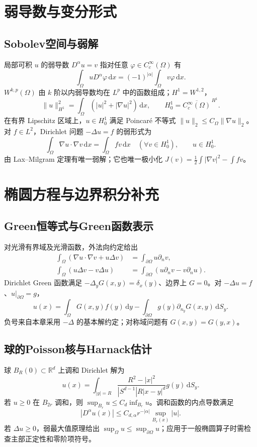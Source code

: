\documentclass[../main.tex]{subfiles}
\begin{document}
\section{弱导数与变分形式}
\subsection{Sobolev空间与弱解}
局部可积 $u$ 的弱导数 $D^\alpha u=v$ 指对任意 $\varphi\in C_c^\infty(\Omega)$ 有
\[
\int_\Omega uD^\alpha\varphi\,\mathrm dx=(-1)^{|\alpha|}\int_\Omega v\varphi\,\mathrm dx.
\]
$W^{k,p}(\Omega)$ 由 $k$ 阶以内弱导数均在 $L^p$ 中的函数组成；$H^1=W^{1,2}$，
\[
\|u\|_{H^1}^2=\int_\Omega(|u|^2+|\nabla u|^2)\,\mathrm dx,\qquad
H_0^1=\overline{C_c^\infty(\Omega)}^{\,H^1}.
\]
在有界 Lipschitz 区域上，$u\in H_0^1$ 满足 Poincaré 不等式 $\|u\|_2\le C_\Omega\|\nabla u\|_2$。对 $f\in L^2$，Dirichlet 问题 $-\Delta u=f$ 的弱形式为
\[
\int_\Omega\nabla u\cdot\nabla v\,\mathrm dx=\int_\Omega fv\,\mathrm dx
\quad(\forall v\in H_0^1),\qquad u\in H_0^1.
\]
由 Lax--Milgram 定理有唯一弱解；它也唯一极小化 $J(v)=\tfrac12\int|\nabla v|^2-\int fv$。
\section{椭圆方程与边界积分补充}
\subsection{Green恒等式与Green函数表示}
对光滑有界域及光滑函数，外法向约定给出
\begin{align*}
\int_\Omega(\nabla u\cdot\nabla v+u\Delta v)&=\int_{\partial\Omega}u\partial_nv,\\
\int_\Omega(u\Delta v-v\Delta u)&=\int_{\partial\Omega}(u\partial_nv-v\partial_nu).
\end{align*}
Dirichlet Green 函数满足 $-\Delta_yG(x,y)=\delta_x(y)$、边界上 $G=0$。对 $-\Delta u=f$、$u|_{\partial\Omega}=g$，
\[
u(x)=\int_\Omega G(x,y)f(y)\,\mathrm dy
-\int_{\partial\Omega}g(y)\partial_{n_y}G(x,y)\,\mathrm dS_y.
\]
负号来自本章采用 $-\Delta$ 的基本解约定；对称域问题有 $G(x,y)=G(y,x)$。
\subsection{球的Poisson核与Harnack估计}
球 $B_R(0)\subset\mathbb R^d$ 上调和 Dirichlet 解为
\[
u(x)=\int_{|y|=R}\frac{R^2-|x|^2}{|S^{d-1}|R|x-y|^d}g(y)\,\mathrm dS_y.
\]
若 $u\ge0$ 在 $B_{2r}$ 调和，则 $\sup_{B_r}u\le C_d\inf_{B_r}u$。调和函数的内点导数满足
\[
|D^\alpha u(x)|\le C_{d,\alpha}r^{-|\alpha|}\sup_{B_r(x)}|u|.
\]
若 $\Delta u\ge0$，弱最大值原理给出 $\sup_\Omega u\le\sup_{\partial\Omega}u$；应用于一般椭圆算子时需检查主部正定性和零阶项符号。
\end{document}
